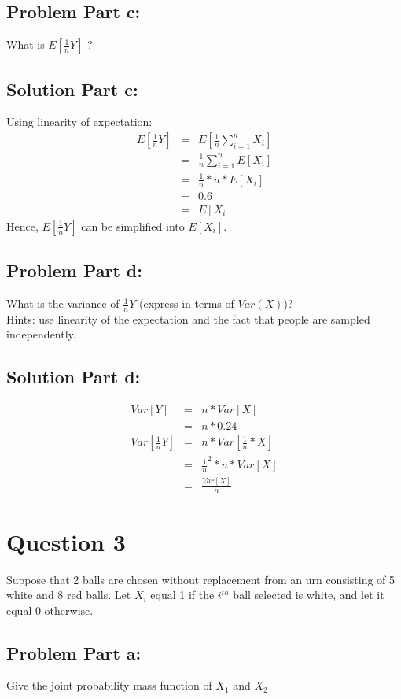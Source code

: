 \documentclass[12pt]{article}%
\begin{document}
\subsection*{Problem Part c:}
What is $E[\frac{1}{n}Y]$ ?
\subsection*{Solution Part c:}
Using linearity of expectation: 
\begin{eqnarray*}
E[\frac{1}{n}Y] & = & E[\frac{1}{n}\sum_{i=1}^{n} X_i] \\
	 & = & \frac{1}{n}\sum_{i=1}^{n} E[X_i] \\
	 & = & \frac{1}{n} * n * E[X_i] \\
	 & = & 0.6 \\
	 & = & E[X_i]
\end{eqnarray*}
Hence, $E[\frac{1}{n}Y]$ can be simplified into $E[X_i]$.
\subsection*{Problem Part d:}
What is the variance of $\frac{1}{n}Y$ (express in terms of $Var(X)$)? \\
Hints: use linearity of the expectation and the fact that people are sampled independently.
\subsection*{Solution Part d:}
\begin{eqnarray*}
    Var[Y]  & = & n * Var[X] \\
    		 & = & n * 0.24 \\
    Var[\frac{1}{n}Y]  & = & n * Var[\frac{1}{n} * X] \\
    				   & = & \frac{1}{n}^2 * n * Var[X] \\
    				   & = & \frac{Var[X]}{n}   			  
\end{eqnarray*}
\newpage
\section*{Question 3}
Suppose that 2 balls are chosen without replacement from an urn consisting of 5 white and 8 red balls. Let $X_i$ equal 1 if the $i^{th}$ ball selected is white, and let it equal 0 otherwise.
\subsection*{Problem Part a:}
Give the joint probability mass function of $X_1$ and $X_2$
\end{document}
